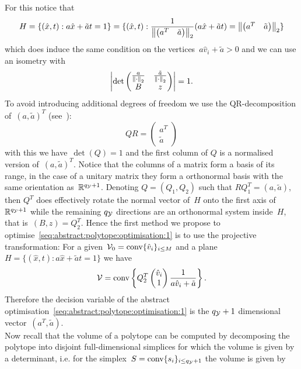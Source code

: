 %
For this notice that
%
\begin{equation}
	H = \{(\hat x,t):a\hat x+\tilde at=1\}=\{(\hat x,t):\frac{1}{\left\|\begin{pmatrix}a^T& \tilde a\end{pmatrix}\right\|_2}(a\hat x+\tilde at)=\left\|\begin{pmatrix}a^T& \tilde a\end{pmatrix}\right\|_2\}
\end{equation}
%
which does induce the same condition on the vertices~$a\hat v_i + \tilde a>0$ and we can use an isometry with
%
\begin{equation}
	\left|\det\begin{pmatrix}\frac{a}{\left\|\cdot\right\|_2} & \frac{\tilde a}{\left\|\cdot\right\|_2}\\
	B & z
	\end{pmatrix}\right|=1.
\end{equation}
%
To avoid introducing additional degrees of freedom we use the QR-decomposition of~$(a,\tilde a)^T$ (see~\cite{Golub:1996}):
%
\begin{equation}
	QR = \begin{pmatrix} a^T\\\tilde a\end{pmatrix}
\end{equation}
%
with this we have~$\det(Q)=1$ and the first column of $Q$ is a normalised version of~$(a,\tilde a)^T$.
%
Notice that the columns of a matrix form a basis of its range, in the case of a unitary matrix they form a orthonormal basis with the same orientation as~$\mathbb R^{q_\mathcal Y+1}$.
%
Denoting $Q = (Q_1,Q_2)$ such that $RQ_1^T=(a,\tilde a)$, then $Q^T$ does effectively rotate the normal vector of~$H$ onto the first axis of $\mathbb R^{q_\mathcal Y+1}$ while the remaining $q_\mathcal Y$ directions are an orthonormal system inside~$H$, that is~$(B,z)=Q_2^T$.
%
Hence the first method we propose to optimise~\eqref{seq:abstract:polytope:optimisation:1} is to use the projective transformation:
%
For a given~$\mathcal V_0=\text{conv}\{\hat v_i\}_{i\leq M}$ and a plane~$H = \{(\hat x,t):a\hat x+\tilde at=1\}$ we have 
%
$$
	\mathcal V = \text{conv}\left\{Q_2^T\begin{pmatrix}\hat v_i \\ 1\end{pmatrix}\frac{1}{a\hat v_i + \tilde a}\right\}.
$$
%
Therefore the decision variable of the abstract optimisation~\eqref{seq:abstract:polytope:optimisation:1} is the $q_\mathcal Y+1$ dimensional vector~$(a^T,\tilde a)$.
%
\\[1em]
%
Now recall that the volume of a polytope can be computed by decomposing the polytope into disjoint full-dimensional simplices for which the volume is given by a determinant, i.e. for the simplex~$S=\text{conv}\{s_i\}_{i\leq q_\mathcal Y+1}$ the volume is given by
